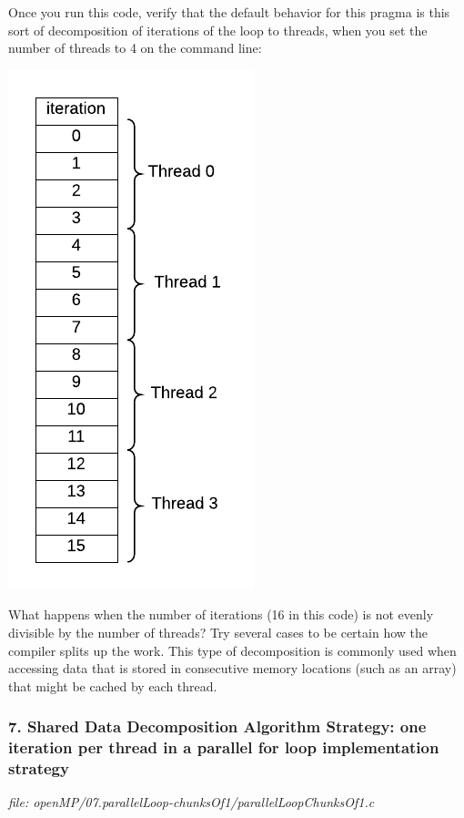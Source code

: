 \documentclass[letterpaper,10pt,openany,oneside]{sphinxmanual}
\begin{document}
Once you run this code, verify that the default behavior for this pragma is this
sort of decomposition of iterations of the loop to threads, when you set the
number of threads to 4 on the command line:

\includegraphics{ParalleFor_Chunks-4_threads-1.png}

What happens when the number of iterations (16 in this code) is not evenly divisible by the number of threads?  Try several cases to be certain how the compiler splits up the work.
This type of decomposition is commonly used when accessing data that is stored in
consecutive memory locations (such as an array) that might be cached by each thread.


\subsubsection{7. Shared Data Decomposition Algorithm Strategy:  one iteration per thread in a parallel for loop implementation strategy}
\label{SharedMemory/DataDecomp_Reduction:shared-data-decomposition-algorithm-strategy-one-iteration-per-thread-in-a-parallel-for-loop-implementation-strategy}
\emph{file: openMP/07.parallelLoop-chunksOf1/parallelLoopChunksOf1.c}
\end{document}
